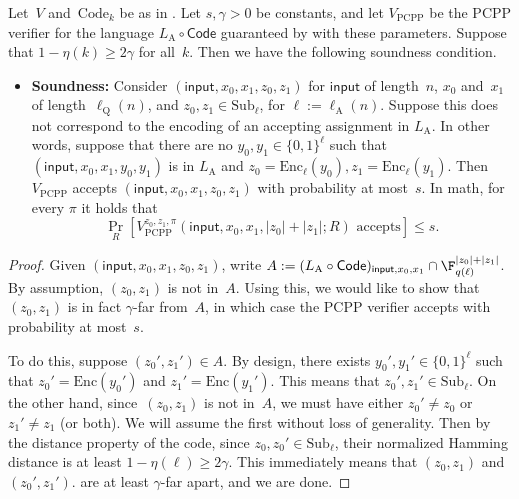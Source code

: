 \documentclass[11pt]{article}
\newcommand{\codec}{\mathrm{Code}}
\newcommand{\codee}{\mathrm{Enc}}
\newcommand{\codes}{\mathrm{Sub}}
\begin{document}
\begin{proposition}\label{prop:new-soundness}
Let~$V$ and~$\codec_k$ be as in .
Let $s, \gamma > 0$ be constants,
and let $V_{\mathrm{PCPP}}$ be the PCPP verifier for the language $L_{\mathrm{A}} \circ \mathsf{Code}$
guaranteed by  with these parameters.
Suppose that $1-\eta(k) \geq 2\gamma$ for all~$k$.
Then we have the following soundness condition.
\begin{itemize}
\item[$\circ$] \textbf{Soundness:} Consider $(\mathsf{input}, x_0, x_1, z_0, z_1)$ for $\mathsf{input}$ of length~$n$, $x_0$ and~$x_1$ of length~$\ell_{\mathrm{Q}}(n)$,
	and $z_0, z_1 \in \codes_{\ell}$, for $\ell := \ell_{\mathrm{A}}(n)$.
	Suppose this does not correspond to the encoding of an accepting assignment in $L_{\mathrm{A}}$.
	In other words, suppose that there are no $y_0, y_1 \in \{0, 1\}^\ell$ such that $(\mathsf{input}, x_0, x_1, y_0, y_1)$ is in $L_{\mathrm{A}}$
	and $z_0 = \codee_{\ell}(y_0), z_1 = \codee_{\ell}(y_1)$.
	Then $V_{\mathrm{PCPP}}$ accepts $(\mathsf{input}, x_0, x_1, z_0, z_1)$ with probability at most~$s$.
	In math, for every $\pi$ it holds that
	\begin{equation*}
		\Pr_R[\text{$V_{\mathrm{PCPP}}^{z_0, z_1, \pi}(\mathsf{input}, x_0, x_1, |z_0| + |z_1|; R)$ accepts}] \leq s.
	\end{equation*}
\end{itemize}
\end{proposition}
\begin{proof}
Given $(\mathsf{input}, x_0, x_1, z_0, z_1)$, write $A:= (L_{\mathrm{A}} \circ \mathsf{Code})_{\mathsf{input}, x_0, x_1} \cap \F_{q(\ell)}^{|z_0| + |z_1|}$.
By assumption, $(z_0, z_1)$ is not in~$A$.
Using this, we would like to show that $(z_0, z_1)$ is in fact $\gamma$-far from~$A$, in which case the PCPP verifier accepts with probability at most~$s$.

To do this, suppose $(z_0', z_1') \in A$.
By design, there exists $y_0', y_1' \in \{0, 1\}^\ell$ such that $z_0' = \codee(y_0')$ and $z_1' = \codee(y_1')$.
This means that $z_0', z_1' \in \codes_{\ell}$.
On the other hand, since~$(z_0, z_1)$ is not in~$A$, we must have either $z_0' \neq z_0$ or $z_1' \neq z_1$ (or both).
We will assume the first without loss of generality.
Then by the distance property of the code, since $z_0, z_0' \in \codes_{\ell}$,
their normalized Hamming distance is at least $1-\eta(\ell) \geq 2\gamma$.
This immediately means that $(z_0,z_1)$ and $(z_0', z_1')$.
are at least $\gamma$-far apart, and we are done.
\end{proof}
\end{document}
